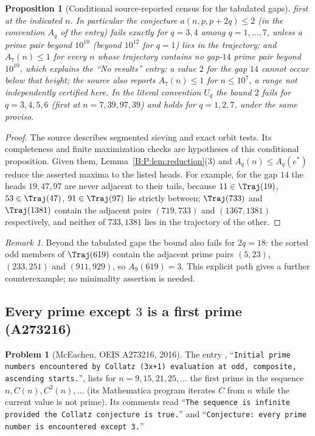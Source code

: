 \documentclass[11pt,a4paper]{article}
\newtheorem{proposition}[theorem]{Proposition}
\theoremstyle{definition}
\newtheorem{problem}[theorem]{Problem}
\theoremstyle{remark}
\newtheorem{remark}[theorem]{Remark}
\numberwithin{equation}{section}
\begin{document}
\begin{proposition}[Conditional source-reported census for the tabulated gaps]
first at the indicated $n$. In particular the conjecture $a(n,p,p+2q)\le2$ (in
the convention $A_q$ of the entry) fails exactly for $q=3,4$ among
$q=1,\dots,7$, unless a prime pair beyond $10^{10}$ (beyond $10^{12}$ for
$q=1$) lies in the trajectory; and $A_7(n)\le1$ for every $n$ whose trajectory
contains no gap-$14$ prime pair beyond $10^{10}$, which explains the ``No results''
entry: a value $2$ for the gap $14$ cannot occur below that height; the source also reports $A_7(n)\le1$ for $n\le10^7$, a range not independently certified here. In the
literal convention $U_q$ the bound $2$ fails for $q=3,4,5,6$ (first at
$n=7,39,97,39$) and holds for $q=1,2,7$, under the same proviso.
\end{proposition}

\begin{proof}
The source describes segmented sieving and exact orbit tests. Its
completeness and finite maximization checks are hypotheses of this
conditional proposition. Given them, Lemma~\ref{B:P:lem:reduction}(3) and
$A_q(n)\le A_q(e^*)$ reduce the asserted maxima to the listed heads. For
example, for the gap $14$ the heads $19,47,97$ are never adjacent to their
tails, because $11\in\Traj(19)$, $53\in\Traj(47)$, $91\in\Traj(97)$ lie strictly
between; $\Traj(733)$ and $\Traj(1381)$ contain the adjacent pairs
$(719,733)$ and $(1367,1381)$ respectively, and neither of $733,1381$ lies in the
trajectory of the other.
\end{proof}

\begin{remark}\label{B:P:rem:gap18}
Beyond the tabulated gaps the bound also fails for $2q=18$: the sorted odd
members of $\Traj(619)$ contain the adjacent prime pairs $(5,23)$, $(233,251)$
and $(911,929)$, so $A_9(619)=3$. This explicit path gives a further counterexample;
no minimality assertion is needed.
\end{remark}

\subsection{Every prime except $3$ is a first prime (A273216)}

\begin{problem}[McEachen, OEIS A273216, 2016]\label{B:P:prob:A273216}
The entry \cite{R040}, ``\texttt{Initial prime numbers encountered by Collatz
(3x+1) evaluation at odd, composite, ascending starts.}'', lists for
$n=9,15,21,25,\dots$ the first prime in the sequence
$n,C(n),C^2(n),\dots$ (its Mathematica program iterates $C$ from $n$ while the
current value is not prime). Its comments read ``\texttt{The sequence is infinite
provided the Collatz conjecture is true.}'' and ``\texttt{Conjecture: every prime number
is encountered except 3.}''
\end{problem}
\end{document}
